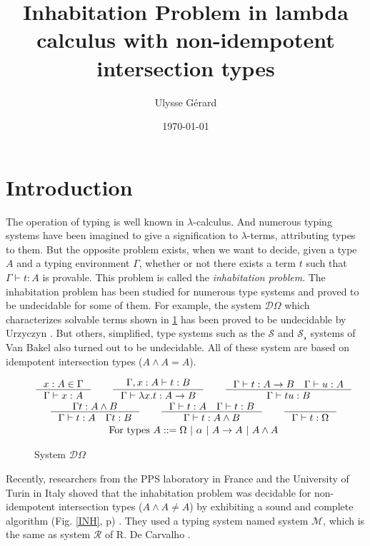 \documentclass{article}
\title{\textbf{Inhabitation Problem in lambda calculus with non-idempotent intersection types}}
\author{Ulysse Gérard}
\date\today
\def\lcalc{$\lambda$-calculus}
\def\lterm{$\lambda$-term}
\begin{document}
\maketitle

\section{Introduction}
The operation of typing is well known in \lcalc. And numerous typing systems have been imagined to give a signification to \lterm s, attributing types to them. But the opposite problem exists, when we want to decide, given a type $A$ and a typing environment $\Gamma$, whether or not there exists a term $t$ such that $\Gamma \vdash t : A$ is provable. This problem is called the \emph{inhabitation problem}.
The inhabitation problem has been studied for numerous type systems and proved to be undecidable for some of them. For example, the system $\mathcal{D}\Omega$ \cite{Kriv} which characterizes solvable terms shown in \ref{SDO} %
has been proved to be undecidable by Urzyczyn \cite{Urz}. But others, simplified, type systems such as the  $\mathcal{S}$ and $\mathcal{S_r}$ systems of Van Bakel \cite{VBak} also turned out to be undecidable. All of these system are based on idempotent intersection types ($A\wedge A = A$).

\begin{figure}
    \begin{mdframed}
        \begin{gather*}
        \inference[]{x : A \in \Gamma}{\Gamma \vdash x : A}
        \qquad
        \inference[]{\Gamma, x : A \vdash t : B}{\Gamma \vdash \lambda x.t : A \rightarrow B}
        \qquad
        \inference[]{\Gamma \vdash t : A \rightarrow B \quad \Gamma \vdash u : A}{\Gamma \vdash tu : B}
        \\
        \inference[]{\Gamma t : A \wedge B}{\Gamma \vdash t : A \quad \Gamma t : B}
        \qquad
        \inference[]{\Gamma \vdash t : A \quad \Gamma \vdash t : B}{\Gamma \vdash t : A \wedge B}
        \qquad
        \inference[]{}{\Gamma \vdash t : \Omega}
        \\ \text{For types } A ::= \Omega \ | \ \alpha \ | \ A \rightarrow A \ | \ A \wedge A
        \end{gather*}
    \end{mdframed}
    \caption{System $\mathcal{D}\Omega$}
    \label{SDO}
\end{figure}

Recently, researchers from the PPS laboratory in France and the University of Turin in Italy shoved that the inhabitation problem was decidable for non-idempotent intersection types ($A\wedge A\neq A$) by exhibiting a sound and complete algorithm (Fig. \ref{INH}, p\pageref{INH}) \cite{Kes}. They used a typing system named system $\mathcal{M}$, which is the same as system $\mathcal{R}$ of R. De Carvalho \cite{DeCarvalho}.
\end{document}
